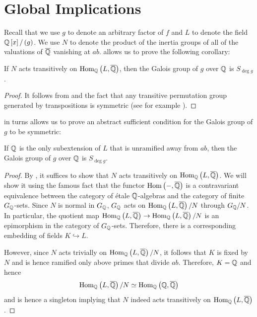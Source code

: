 \documentclass[../main.tex]{subfiles}
\begin{document}
  \section{
    \label{sec:global}
    Global Implications
  }
  Recall that we use $g$ to denote an arbitrary factor of $f$ and $L$ to denote the field $\mathbb{Q}\left[ x \right] / \left( g \right)$.
  We use $N$ to denote the product of the inertia groups of all of the valuations of $\overline{\mathbb{Q}}$ vanishing at $ab$.
   allows us to prove the following corollary:
  \begin{corollary}
    \label{cor:transitive_action}
    If $N$ acts transitively on $\operatorname{\rm Hom}_{\mathbb{Q}}\left( L, \overline{\mathbb{Q}} \right)$, then the Galois group of $g$ over $\mathbb{Q}$ is $S_{\deg g}$.
  \end{corollary}
  \begin{proof}
    It follows from  and the fact that any transitive permutation group generated by transpositions is symmetric (see for example \cite[Lemma 5]{Osada1987TheGG}).
  \end{proof}

   in turns allows us to prove an abstract sufficient condition for the Galois group of $g$ to be symmetric:
  \begin{theorem}
    \label{thm:strategy}
    If $\mathbb{Q}$ is the only subextension of $L$ that is unramified away from $ab$, then the Galois group of $g$ over $\mathbb{Q}$ is $S_{\deg g}$.
  \end{theorem}
  \begin{proof}
    By , it suffices to show that $N$ acts transitively on $\operatorname{\rm Hom}_{\mathbb{Q}}\left( L, \overline{\mathbb{Q}} \right)$.
    We will show it using the famous fact that the functor $\operatorname{\rm Hom}\left( -, \overline{\mathbb{Q}} \right)$ is a contravariant equivalence between the category of \'{e}tale $\mathbb{Q}$-algebras and the category of finite $G_{\mathbb{Q}}$-sets.
    Since $N$ is normal in $G_{\mathbb{Q}}$, $G_{\mathbb{Q}}$ acts on $\operatorname{\rm Hom}_{\mathbb{Q}}\left( L, \overline{\mathbb{Q}} \right) / N$  through $G_{\mathbb{Q}}/N$.
    In particular, the quotient map $\operatorname{\rm Hom}_{\mathbb{Q}}\left( L, \overline{\mathbb{Q}} \right) \to \operatorname{\rm Hom}_{\mathbb{Q}}\left( L, \overline{\mathbb{Q}} \right) / N$ is an epimorphism in the category of $G_{\mathbb{Q}}$-sets.
    Therefore, there is a corresponding embedding of fields $K \hookrightarrow L$.
    
    However, since $N$ acts trivially on $\operatorname{\rm Hom}_{\mathbb{Q}}\left( L, \overline{\mathbb{Q}} \right) / N$, it follows that $K$ is fixed by $N$ and is hence ramified only above primes that divide $ab$.
    Therefore, $K = \mathbb{Q}$ and hence 
    \[
      \operatorname{\rm Hom}_{\mathbb{Q}}\left( L, \overline{\mathbb{Q}} \right) / N \simeq 
      \operatorname{\rm Hom}_{\mathbb{Q}}\left( \mathbb{Q}, \overline{\mathbb{Q}} \right) 
    \] 
    and is hence a singleton implying that $N$ indeed acts transitively on $\operatorname{\rm Hom}_{\mathbb{Q}}\left( L, \overline{\mathbb{Q}} \right)$.
  \end{proof}
\end{document}

